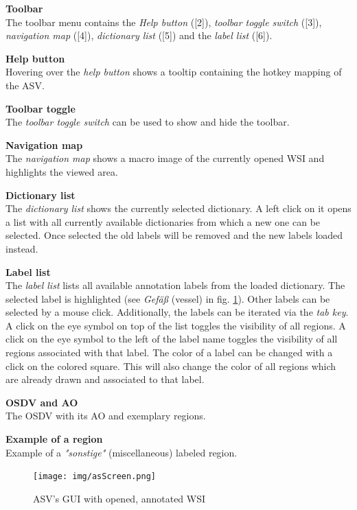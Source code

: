 \begin{enumerate}[{[}1{]}]
	\item \textbf{Toolbar}\\
	The toolbar menu contains the \emph{Help button} ([2]), \emph{toolbar toggle switch} ([3]), \emph{navigation map} ([4]), \emph{dictionary list} ([5]) and the \emph{label list} ([6]).
	\item \textbf{Help button}\\
	Hovering over the \emph{help button} shows a tooltip containing the hotkey mapping of the ASV.
	\item \textbf{Toolbar toggle}\\
	The \emph{toolbar toggle switch} can be used to show and hide the toolbar.
	\item \textbf{Navigation map}\\
	The \emph{navigation map} shows a macro image of the currently opened WSI and highlights the viewed area.
	\item \textbf{Dictionary list}\\
	The \emph{dictionary list} shows the currently selected dictionary. A left click on it opens a list with all currently available dictionaries from which a new one can be selected. Once selected the old labels will be removed and the new labels loaded instead.
	\item \textbf{Label list}\\
	The \emph{label list} lists all available annotation labels from the loaded dictionary. The selected label is highlighted (see \emph{Gef\"a\ss} (vessel) in fig. \ref{fig4_asSCreen}). Other labels can be selected by a mouse click. Additionally, the labels can be iterated via the \emph{tab key}. A click on the eye symbol on top of the list toggles the visibility of all regions. A click on the eye symbol to the left of the label name toggles the visibility of all regions associated with that label. The color of a label can be changed with a click on the colored square. This will also change the color of all regions which are already drawn and associated to that label.
	\item \textbf{OSDV and AO}\\
	The OSDV with its AO and exemplary regions.
	\item \textbf{Example of a region}\\
	Example of a \emph{"sonstige"} (miscellaneous) labeled region.
	
\end{enumerate}

\begin{figure}[!h]
	\begin{center}
		\texttt{[image: img/asScreen.png]}
		\caption{ASV's GUI with opened, annotated WSI}
		\label{fig4_asSCreen}
	\end{center}
\end{figure}